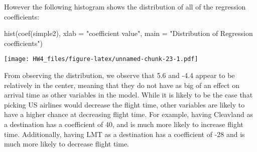 \documentclass[
]{article}
\newenvironment{Shaded}{\begin{snugshade}}{\end{snugshade}}
\newcommand{\AttributeTok}[1]{\textcolor[rgb]{0.77,0.63,0.00}{#1}}
\newcommand{\FunctionTok}[1]{\textcolor[rgb]{0.00,0.00,0.00}{#1}}
\newcommand{\NormalTok}[1]{#1}
\newcommand{\StringTok}[1]{\textcolor[rgb]{0.31,0.60,0.02}{#1}}
\begin{document}
However the following histogram shows the distribution of all of the
regression coefficients:

\begin{Shaded}
\begin{Highlighting}[]
\FunctionTok{hist}\NormalTok{(}\FunctionTok{coef}\NormalTok{(simple2), }\AttributeTok{xlab =} \StringTok{"coefficient value"}\NormalTok{, }\AttributeTok{main =} \StringTok{"Distribution of Regression coefficients"}\NormalTok{)}
\end{Highlighting}
\end{Shaded}

\texttt{[image: HW4\_files/figure-latex/unnamed-chunk-23-1.pdf]}

From observing the distribution, we observe that 5.6 and -4.4 appear to
be relatively in the center, meaning that they do not have as big of an
effect on arrival time as other variables in the model. While it is
likely to be the case that picking US airlines would decrease the flight
time, other variables are likely to have a higher chance at decreasing
flight time. For example, having Cleavland as a destination has a
coefficient of 40, and is much more likely to increase flight time.
Additionally, having LMT as a destination has a coefficient of -28 and
is much more likely to decrease flight time.
\end{document}
